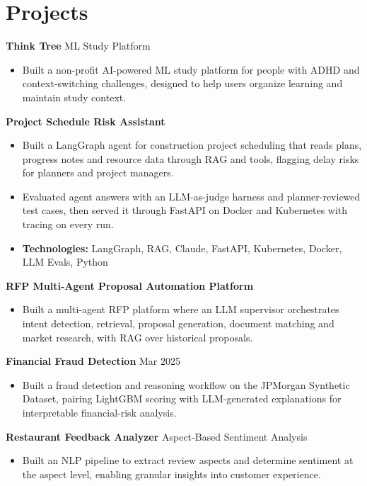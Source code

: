 \documentclass[10pt,a4paper]{article}
\begin{document}
\section{Projects}
\textbf{Think Tree} \textbar{} ML Study Platform\par
\begin{itemize}
  \item Built a non-profit AI-powered ML study platform for people with ADHD and context-switching challenges, designed to help users organize learning and maintain study context.
\end{itemize}
\textbf{Project Schedule Risk Assistant}\par
\begin{itemize}
  \item Built a LangGraph agent for construction project scheduling that reads plans, progress notes and resource data through RAG and tools, flagging delay risks for planners and project managers.
  \item Evaluated agent answers with an LLM-as-judge harness and planner-reviewed test cases, then served it through FastAPI on Docker and Kubernetes with tracing on every run.
  \item \textbf{Technologies:} LangGraph, RAG, Claude, FastAPI, Kubernetes, Docker, LLM Evals, Python
\end{itemize}
\textbf{RFP Multi-Agent Proposal Automation Platform}\par
\begin{itemize}
  \item Built a multi-agent RFP platform where an LLM supervisor orchestrates intent detection, retrieval, proposal generation, document matching and market research, with RAG over historical proposals.
\end{itemize}
\textbf{Financial Fraud Detection} \textbar{} Mar 2025\par
\begin{itemize}
  \item Built a fraud detection and reasoning workflow on the JPMorgan Synthetic Dataset, pairing LightGBM scoring with LLM-generated explanations for interpretable financial-risk analysis.
\end{itemize}
\textbf{Restaurant Feedback Analyzer} \textbar{} Aspect-Based Sentiment Analysis\par
\begin{itemize}
  \item Built an NLP pipeline to extract review aspects and determine sentiment at the aspect level, enabling granular insights into customer experience.
\end{itemize}
\end{document}
